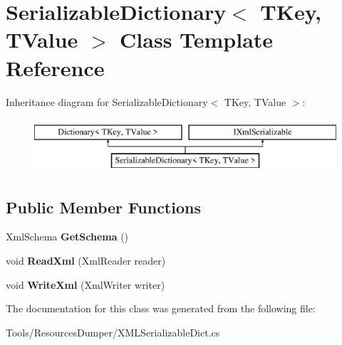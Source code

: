 \hypertarget{class_serializable_dictionary_3_01_t_key_00_01_t_value_01_4}{\section{Serializable\-Dictionary$<$ T\-Key, T\-Value $>$ Class Template Reference}
\label{class_serializable_dictionary_3_01_t_key_00_01_t_value_01_4}
}
Inheritance diagram for Serializable\-Dictionary$<$ T\-Key, T\-Value $>$\-:\begin{figure}[H]
\begin{center}
\leavevmode
\includegraphics[height=2.000000cm]{class_serializable_dictionary_3_01_t_key_00_01_t_value_01_4}
\end{center}
\end{figure}
\subsection*{Public Member Functions}
\begin{DoxyCompactItemize}
\item 
\hypertarget{class_serializable_dictionary_3_01_t_key_00_01_t_value_01_4_af5f3a702f9ce598951b71288a3735284}{Xml\-Schema {\bfseries Get\-Schema} ()}\label{class_serializable_dictionary_3_01_t_key_00_01_t_value_01_4_af5f3a702f9ce598951b71288a3735284}

\item 
\hypertarget{class_serializable_dictionary_3_01_t_key_00_01_t_value_01_4_a9c020c86f378fa55383e0fec1b197d2c}{void {\bfseries Read\-Xml} (Xml\-Reader reader)}\label{class_serializable_dictionary_3_01_t_key_00_01_t_value_01_4_a9c020c86f378fa55383e0fec1b197d2c}

\item 
\hypertarget{class_serializable_dictionary_3_01_t_key_00_01_t_value_01_4_a7ddc11060bd1c9da4c7c6e5741194ff6}{void {\bfseries Write\-Xml} (Xml\-Writer writer)}\label{class_serializable_dictionary_3_01_t_key_00_01_t_value_01_4_a7ddc11060bd1c9da4c7c6e5741194ff6}

\end{DoxyCompactItemize}


The documentation for this class was generated from the following file\-:\begin{DoxyCompactItemize}
\item 
Tools/\-Resources\-Dumper/X\-M\-L\-Serializable\-Dict.\-cs\end{DoxyCompactItemize}
